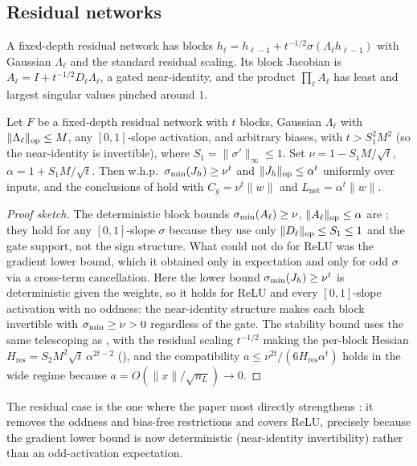 \subsection{Residual networks}
A fixed-depth residual network has blocks $h_\ell=h_{\ell-1}+t^{-1/2}\sigma(\Lambda_\ell h_{\ell-1})$
with Gaussian $\Lambda_\ell$ and the standard residual scaling. Its block Jacobian is
$A_\ell=I+t^{-1/2}D_\ell\Lambda_\ell$, a gated near-identity, and the product $\prod_\ell A_\ell$ has
least and largest singular values pinched around $1$.

\begin{theorem}\label{thm:resnet}
Let $F$ be a fixed-depth residual network with $t$ blocks, Gaussian $\Lambda_\ell$ with $\|\Lambda_\ell\|_{\mathrm{op}}\le M$,
any $[0,1]$-slope activation, and arbitrary biases, with $t>S_1^2M^2$ (so the near-identity is
invertible), where $S_1=\|\sigma'\|_\infty\le1$. Set $\nu=1-S_1M/\sqrt t$, $\alpha=1+S_1M/\sqrt t$. Then
w.h.p.\ $\sigma_{\min}(J_h)\ge\nu^t$ and $\|J_h\|_{\mathrm{op}}\le\alpha^t$ uniformly over inputs, and the conclusions of
 hold with $C_g=\nu^t\|w\|$ and $L_{\mathrm{net}}=\alpha^t\|w\|$.
\end{theorem}

\begin{proof}[Proof sketch]
The deterministic block bounds $\sigma_{\min}(A_\ell)\ge\nu$, $\|A_\ell\|_{\mathrm{op}}\le\alpha$ are \cite[Prop 5.6]{advExt};
they hold for any $[0,1]$-slope $\sigma$ because they use only $\|D_\ell\|_{\mathrm{op}}\le S_1\le1$ and the gate
support, not the sign structure. What \cite{advExt} could not do for ReLU was the gradient lower bound,
which it obtained only in expectation and only for odd $\sigma$ via a cross-term cancellation. Here the
lower bound $\sigma_{\min}(J_h)\ge\nu^t$ is deterministic given the weights, so it holds for ReLU and every
$[0,1]$-slope activation with no oddness: the near-identity structure makes each block invertible with
$\sigma_{\min}\ge\nu>0$ regardless of the gate. The stability bound uses the same telescoping as
, with the residual scaling $t^{-1/2}$ making the per-block Hessian
$H_{\mathrm{res}}=S_2M^2\sqrt t\,\alpha^{2t-2}$ (\cite[Prop 5.6(c)]{advExt}), and the compatibility
$a\le\nu^{2t}/(6H_{\mathrm{res}}\alpha^t)$ holds in the wide regime because $a=O(\|x\|/\sqrt{n_L})\to0$.
\end{proof}

The residual case is the one where the paper most directly strengthens \cite{advExt}: it removes the
oddness and bias-free restrictions and covers ReLU, precisely because the gradient lower bound is now
deterministic (near-identity invertibility) rather than an odd-activation expectation.

